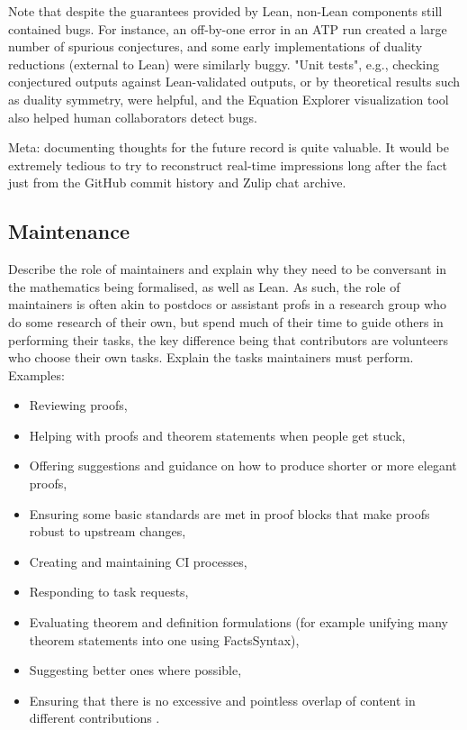 Note that despite the guarantees provided by Lean, non-Lean components still contained bugs. For instance, an off-by-one error in an ATP run created a large number of spurious conjectures, and some early implementations of duality reductions (external to Lean) were similarly buggy. "Unit tests", e.g., checking conjectured outputs against Lean-validated outputs, or by theoretical results such as duality symmetry, were helpful, and the Equation Explorer visualization tool also helped human collaborators detect bugs.

Meta: documenting thoughts for the future record is quite valuable. It would be extremely tedious to try to reconstruct real-time impressions long after the fact just from the GitHub commit history and Zulip chat archive.

\subsection{Maintenance}

Describe the role of maintainers and explain why they need to be conversant in the mathematics being formalised, as well as Lean. As such, the role of maintainers is often akin to postdocs or assistant profs in a research group who do some research of their own, but spend much of their time to guide others in performing their tasks, the key difference being that contributors are volunteers who choose their own tasks. Explain the tasks maintainers must perform. Examples:

\begin{itemize}
    \item Reviewing proofs,
    \item Helping with proofs and theorem statements when people get stuck,
    \item Offering suggestions and guidance on how to produce shorter or more elegant proofs,
    \item Ensuring some basic standards are met in proof blocks that make proofs robust to upstream changes,
    \item Creating and maintaining CI processes,
    \item Responding to task requests,
    \item Evaluating theorem and definition formulations (for example unifying many theorem statements into one using FactsSyntax),
    \item Suggesting better ones where possible,
    \item Ensuring that there is no excessive and pointless overlap of content in different contributions .
\end{itemize}
